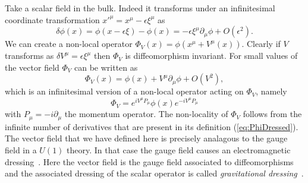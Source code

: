 \documentclass{PoS}
\newcommand{\LF}{\left(}
\newcommand{\RF}{\right)}
\begin{document}
Take a scalar field in the bulk. Indeed it transforms under an infinitesimal coordinate transformation $x'^\mu=x^\mu-\epsilon \xi^\mu$ as
\begin{equation}
\delta \phi(x) = \phi(x-\epsilon\xi) - \phi(x) = -\epsilon \xi^\mu\partial_\mu \phi + O(\epsilon^2).
\end{equation}
We can create a non-local operator $\Phi_V (x) = \phi\LF x^\mu + V^\mu(x)\RF $. Clearly if $V$ transforms as $\delta V^\mu = \epsilon \xi^\mu$ then $\Phi_V$ is diffeomorphism invariant. For small values of the vector field $\Phi_V$ can be written as
\begin{equation}
\Phi_V(x) = \phi(x) + V^\mu \partial_\mu \phi + O(V^2),
\end{equation}
which is an infinitesimal version of a non-local operator acting on $\Phi_V$, namely
\begin{equation}
\Phi_V = e^{i V^\mu P_\mu} \phi(x) e^{-iV^\mu P_\mu}
\label{eq:PhiDressed}
\end{equation}
with $P_\mu= -i\partial_\mu$ the momentum operator. The non-locality of $\Phi_V$ follows from the infinite number of derivatives that are present in its definition (\ref{eq:PhiDressed}). The vector field that we have defined here is precisely analagous to the gauge field in a $U(1)$ theory. In that case the gauge field causes an electromagnetic dressing~\cite{Dirac:1955uv}. Here the vector field is the gauge field associated to diffeomorphisms and the associated dressing of the scalar operator is called \textit{gravitational dressing}~\cite{Donnelly:2015hta}.\\
\end{document}

